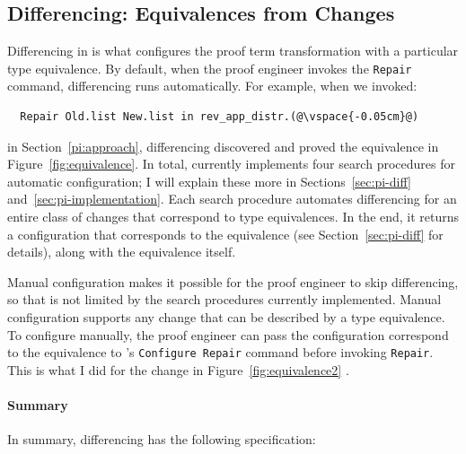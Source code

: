 \subsection{Differencing: Equivalences from Changes}
\label{sec:pi-spec-diff}

Differencing in \toolnamec is what configures the proof term transformation with a particular type equivalence.
By default, when the proof engineer invokes the \lstinline{Repair} command, differencing runs automatically.
For example, when we invoked:

\begin{lstlisting}
  Repair Old.list New.list in rev_app_distr.(@\vspace{-0.05cm}@)
\end{lstlisting}
in Section~\ref{pi:approach}, differencing discovered and proved the equivalence in Figure~\ref{fig:equivalence}.
In total, \toolnamec currently implements four search procedures for automatic configuration;
I will explain these more in Sections~\ref{sec:pi-diff} and~\ref{sec:pi-implementation}.
Each search procedure automates differencing for an entire class of changes that correspond to type equivalences. 
In the end, it returns a configuration that corresponds to the equivalence (see Section~\ref{sec:pi-diff} for details),
along with the equivalence itself.

Manual configuration makes it possible for the proof engineer to skip differencing, so that \toolnamec is not limited by the 
search procedures currently implemented.
Manual configuration supports any change that can be described by a type equivalence.
To configure \toolnamec manually, the proof engineer can pass the configuration correspond to the equivalence to \toolnamec's \lstinline{Configure Repair} command before invoking \lstinline{Repair}.
This is what I did for the change in Figure~\ref{fig:equivalence2} \href{https://github.com/uwplse/pumpkin-pi/blob/v2.0.0/plugin/coq/playground/constr_refactor.v}{}.

\paragraph{Summary}

In summary, differencing has the following specification:

